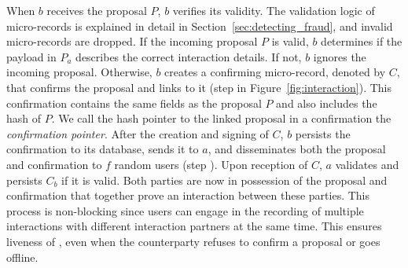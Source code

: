 
When $ b $ receives the proposal $ P $, $ b $ verifies its validity.
The validation logic of micro-records is explained in detail in Section~\ref{sec:detecting_fraud}, and invalid micro-records are dropped.
If the incoming proposal $ P $ is valid, $ b $ determines if the payload in $ P_a $ describes the correct interaction details.
If not, $ b $ ignores the incoming proposal.
Otherwise, $ b $ creates a confirming micro-record, denoted by $ C $, that confirms the proposal and links to it (step  in Figure~\ref{fig:interaction}).
This confirmation contains the same fields as the proposal $ P $ and also includes the hash of $ P $.
We call the hash pointer to the linked proposal in a confirmation the \emph{confirmation pointer}.
After the creation and signing of $ C $, $ b $ persists the confirmation to its database, sends it to $ a $, and disseminates both the proposal and confirmation to $ f $ random users (step ).
Upon reception of $ C $, $ a $ validates and persists $ C_b $ if it is valid.
Both parties are now in possession of the proposal and confirmation that together prove an interaction between these parties.
This process is non-blocking since users can engage in the recording of multiple interactions with different interaction partners at the same time.
This ensures liveness of \ModelName{}, even when the counterparty refuses to confirm a proposal or goes offline.



